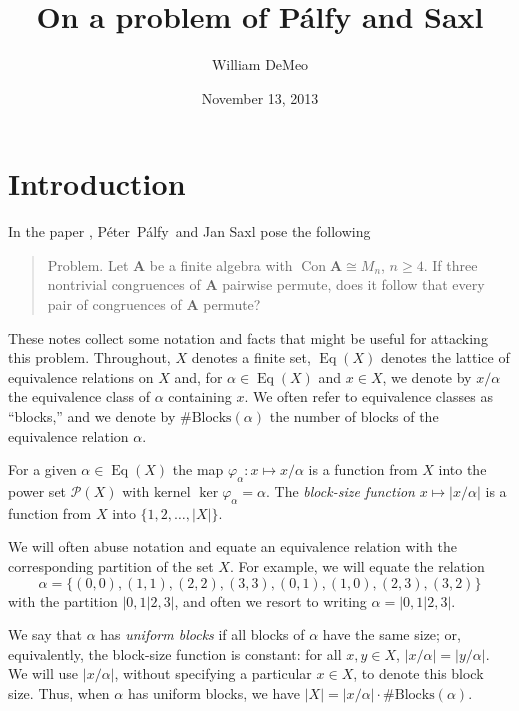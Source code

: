 \documentclass{amsart}
\theoremstyle{plain}
\theoremstyle{definition}
\theoremstyle{definition}
\numberwithin{equation}{section}
\renewcommand{\phi}{\ensuremath{\varphi}}
\newcommand{\<}{\ensuremath{\langle}}
\renewcommand{\>}{\ensuremath{\rangle}}
\renewcommand{\geq}{\ensuremath{\geqslant}}
\newcommand{\Peter}{P{\'e}ter}
\newcommand{\Palfy}{P\'alfy}
\newcommand{\bA}{\ensuremath{\mathbf{A}}}
\newcommand{\sP}{\ensuremath{\mathscr{P}}}
\newcommand{\Con}{\ensuremath{\operatorname{Con}}}
\newcommand{\Eq}{\ensuremath{\operatorname{Eq}}}
\newcommand{\nb}[1]{\ensuremath{\#\mathrm{Blocks}(#1)}}
\begin{document}
\title{On a problem of P\'{a}lfy and Saxl}
\author{William DeMeo}
\date{November 13, 2013}

\maketitle

\section{Introduction}
In the paper \cite{PalfySaxl}, \Peter\ \Palfy\ and Jan Saxl pose the following 
\begin{quote}
  {\sc Problem.} Let $\bA$ be a finite algebra with $\Con \bA \cong M_n$, $n\geq
  4$. If three nontrivial congruences of $\bA$ pairwise permute, does it follow
  that every pair of congruences of $\bA$ permute?
\end{quote}

These notes collect some notation and facts that might be useful for attacking this problem.
Throughout, $X$ denotes a finite set, $\Eq(X)$ denotes the lattice of
equivalence relations on $X$ and, for $\alpha \in \Eq(X)$ and $x\in X$, we
denote by $x/\alpha$ the equivalence class of $\alpha$ containing $x$.
We often refer to equivalence classes as
``blocks,'' and we denote by $\nb{\alpha}$ the number of blocks of the
equivalence relation $\alpha$. 

For a given $\alpha\in \Eq(X)$ the map 
 $\phi_\alpha: x \mapsto x/\alpha$ is a
function from $X$ into the power set $\sP(X)$
with kernel $\ker \phi_\alpha = \alpha$. 
The \emph{block-size function} $x \mapsto |x/\alpha|$ is a function from $X$ into $\{1,2,\dots, |X|\}$.

We will often abuse notation and equate an equivalence relation with the
corresponding partition of the set $X$.  For example, we will equate 
the relation 
\[
\alpha = \{(0,0), (1,1), (2,2), (3,3), (0,1), (1,0), (2,3), (3,2)\}
\]
with the partition $|0,1|2,3|$, and often we resort to writing $\alpha = |0,1|2,3|$.

We say that $\alpha$ has \emph{uniform blocks} if 
all blocks of  $\alpha$ have the same size; or, equivalently,
the block-size function is constant: for all 
$x, y \in X$, $|x/\alpha| = |y/\alpha|$.  We will use $|x/\alpha|$, without specifying
a particular $x\in X$, to denote this block size.
Thus, when $\alpha$
has uniform blocks, we have $|X|= |x/\alpha| \cdot \nb{\alpha}$.
\end{document}
